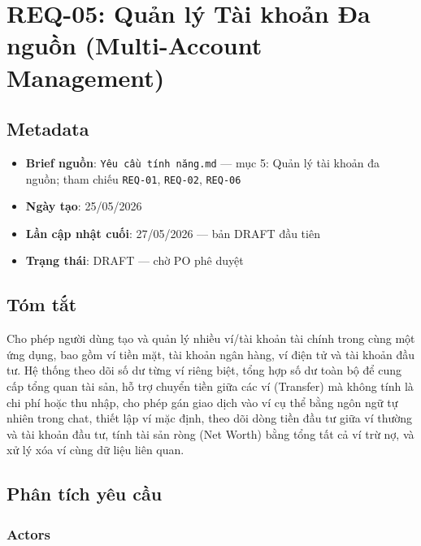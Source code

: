 \section{REQ-05: Quản lý Tài khoản Đa nguồn (Multi-Account Management)}



\subsection{Metadata}

\begin{itemize}
\item \textbf{Brief nguồn}: \texttt{Yêu cầu tính năng.md} — mục 5: Quản lý tài khoản đa nguồn; tham chiếu \texttt{REQ-01}, \texttt{REQ-02}, \texttt{REQ-06}
\item \textbf{Ngày tạo}: 25/05/2026
\item \textbf{Lần cập nhật cuối}: 27/05/2026 — bản DRAFT đầu tiên
\item \textbf{Trạng thái}: DRAFT — chờ PO phê duyệt
\end{itemize}
\subsection{Tóm tắt}

Cho phép người dùng tạo và quản lý nhiều ví/tài khoản tài chính trong cùng một ứng dụng, bao gồm ví tiền mặt, tài khoản ngân hàng, ví điện tử và tài khoản đầu tư. Hệ thống theo dõi số dư từng ví riêng biệt, tổng hợp số dư toàn bộ để cung cấp tổng quan tài sản, hỗ trợ chuyển tiền giữa các ví (Transfer) mà không tính là chi phí hoặc thu nhập, cho phép gán giao dịch vào ví cụ thể bằng ngôn ngữ tự nhiên trong chat, thiết lập ví mặc định, theo dõi dòng tiền đầu tư giữa ví thường và tài khoản đầu tư, tính tài sản ròng (Net Worth) bằng tổng tất cả ví trừ nợ, và xử lý xóa ví cùng dữ liệu liên quan.



\subsection{Phân tích yêu cầu}



\subsubsection{Actors}

